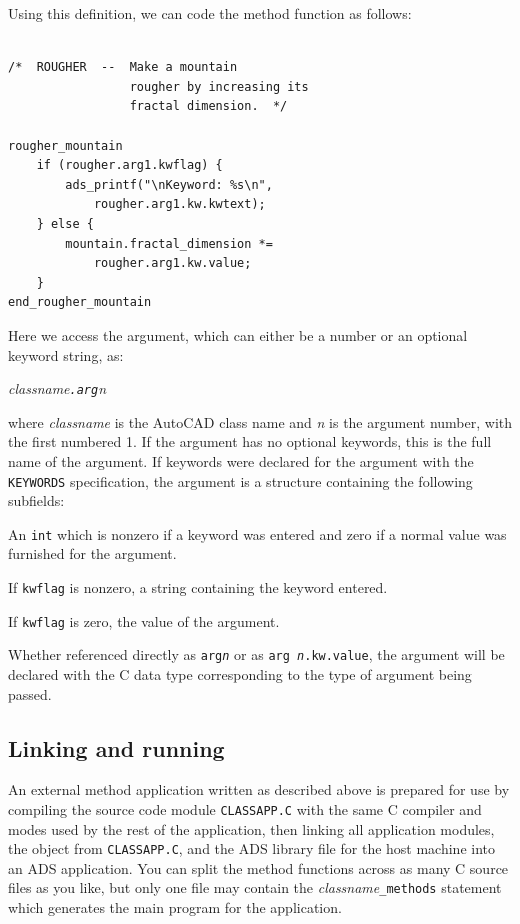 \documentclass{article}
\begin{document}
Using this definition, we can code the method function as follows:

{\small
\begin{verbatim}

/*  ROUGHER  --  Make a mountain
                 rougher by increasing its
                 fractal dimension.  */

rougher_mountain
    if (rougher.arg1.kwflag) {
        ads_printf("\nKeyword: %s\n",
            rougher.arg1.kw.kwtext);
    } else {
        mountain.fractal_dimension *=
            rougher.arg1.kw.value;
    }
end_rougher_mountain
\end{verbatim}
}

Here we access the argument, which can either be a number or an
optional keyword string, as:

{\em classname{\tt .arg}n}

where {\em classname} is the AutoCAD class name and {\em n} is the
argument number, with the first numbered 1.  If the argument has no
optional keywords, this is the full name of the argument.  If keywords
were declared for the argument with the {\tt KEYWORDS} specification,
the argument is a structure containing the following
subfields:

\begin{description}
\setlength{\itemsep}{-1ex}
\item[{\tt kwflag}]     An {\tt int} which is nonzero if a keyword
                        was entered and zero if a normal value
                        was furnished for the argument.
\item[{\tt kw.kwtext}]  If {\tt kwflag} is nonzero, a string
                        containing the keyword entered.
\item[{\tt kw.value}]   If {\tt kwflag} is zero, the value of the
                        argument.
\end{description}

Whether referenced directly as {\tt arg{\em n}} or as {\tt  arg{\em
n}.kw.value}, the argument will be declared with the C data type
corresponding to the type of argument being passed.

\subsection{Linking and running}

An external method application written as described above is prepared
for use by compiling the source code module {\tt CLASSAPP.C} with the
same C compiler and modes used by the rest of the application, then
linking all application modules, the object from {\tt CLASSAPP.C}, and
the ADS library file for the host machine into an ADS application.
You can split the method functions across as many C source files as
you like, but only one file may contain the {\em classname}\verb+_methods+
statement which generates the main program for the application.
\end{document}
